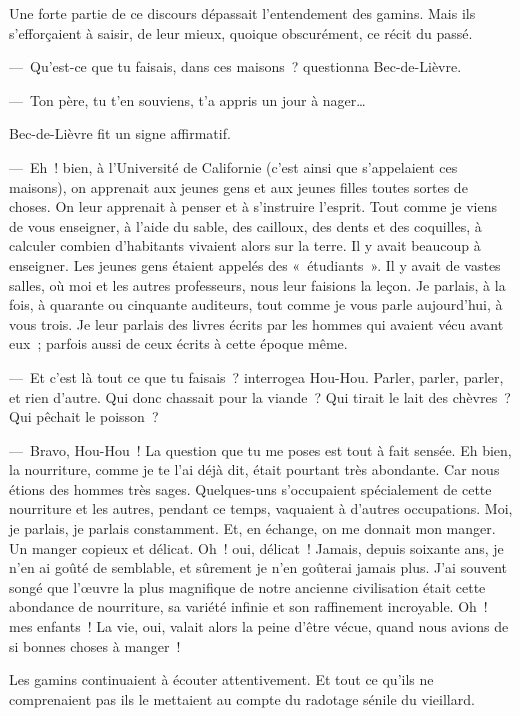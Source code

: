 \documentclass[french,twoside]{book} %
\begin{document}
Une forte partie de ce discours dépassait l’entendement des gamins. Mais ils s’efforçaient à saisir, de leur mieux, quoique obscurément, ce récit du passé.\par
— Qu’est-ce que tu faisais, dans ces maisons ? questionna Bec-de-Lièvre.\par
— Ton père, tu t’en souviens, t’a appris un jour à nager…\par
Bec-de-Lièvre fit un signe affirmatif.\par
— Eh ! bien, à l’Université de Californie (c’est ainsi que s’appelaient ces maisons), on apprenait aux jeunes gens et aux jeunes filles toutes sortes de choses. On leur apprenait à penser et à s’instruire l’esprit. Tout comme je viens de vous enseigner, à l’aide du sable, des cailloux, des dents et des coquilles, à calculer combien d’habitants vivaient alors sur la terre. Il y avait beaucoup à enseigner. Les jeunes gens étaient appelés des « étudiants ». Il y avait de vastes salles, où moi et les autres professeurs, nous leur faisions la leçon. Je parlais, à la fois, à quarante ou cinquante auditeurs, tout comme je vous parle aujourd’hui, à vous trois. Je leur parlais des livres écrits par les hommes qui avaient vécu avant eux ; parfois aussi de ceux écrits à cette époque même.\par
— Et c’est là tout ce que tu faisais ? interrogea Hou-Hou. Parler, parler, parler, et rien d’autre. Qui donc chassait pour la viande ? Qui tirait le lait des chèvres ? Qui pêchait le poisson ?\par
— Bravo, Hou-Hou ! La question que tu me poses est tout à fait sensée. Eh bien, la nourriture, comme je te l’ai déjà dit, était pourtant très abondante. Car nous étions des hommes très sages. Quelques-uns s’occupaient spécialement de cette nourriture et les autres, pendant ce temps, vaquaient à d’autres occupations. Moi, je parlais, je parlais constamment. Et, en échange, on me donnait mon manger. Un manger copieux et délicat. Oh ! oui, délicat ! Jamais, depuis soixante ans, je n’en ai goûté de semblable, et sûrement je n’en goûterai jamais plus. J’ai souvent songé que l’œuvre la plus magnifique de notre ancienne civilisation était cette abondance de nourriture, sa variété infinie et son raffinement incroyable. Oh ! mes enfants ! La vie, oui, valait alors la peine d’être vécue, quand nous avions de si bonnes choses à manger !\par
Les gamins continuaient à écouter attentivement. Et tout ce qu’ils ne comprenaient pas ils le mettaient au compte du radotage sénile du vieillard.\par
\end{document}
